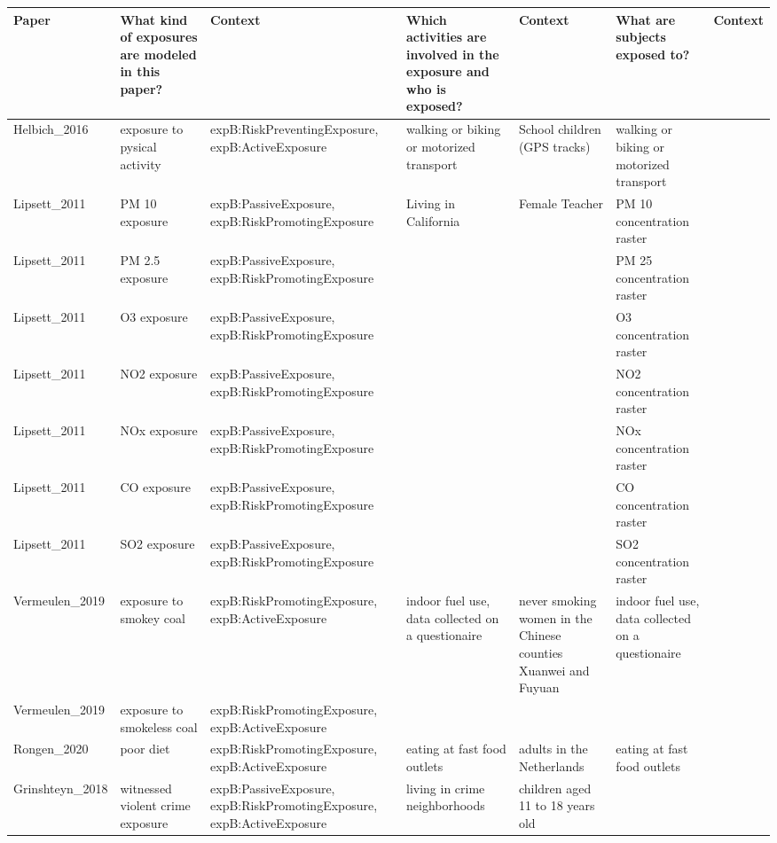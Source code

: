 \begin{tabular}{p{1cm}p{1cm}p{1cm}p{1cm}p{1cm}p{1cm}p{1cm}}
\toprule
          Paper & What kind of exposures are modeled in this paper? &                                                               Context & Which activities are involved in the exposure and who is exposed? &                                                        Context &                     What are subjects exposed to? & Context \\
\midrule
Helbich\_2016 & exposure to pysical activity & expB:RiskPreventingExposure, expB:ActiveExposure & walking or biking or motorized transport & School children (GPS tracks) & walking or biking or motorized transport &  \\
Lipsett\_2011 & PM 10 exposure & expB:PassiveExposure, expB:RiskPromotingExposure & Living in California & Female Teacher & PM 10 concentration raster &  \\
Lipsett\_2011 & PM 2.5 exposure & expB:PassiveExposure, expB:RiskPromotingExposure &  &  & PM 25 concentration raster &  \\
Lipsett\_2011 & O3 exposure & expB:PassiveExposure, expB:RiskPromotingExposure &  &  & O3 concentration raster &  \\
Lipsett\_2011 & NO2 exposure & expB:PassiveExposure, expB:RiskPromotingExposure &  &  & NO2 concentration raster &  \\
Lipsett\_2011 & NOx exposure & expB:PassiveExposure, expB:RiskPromotingExposure &  &  & NOx concentration raster &  \\
Lipsett\_2011 & CO exposure & expB:PassiveExposure, expB:RiskPromotingExposure &  &  & CO concentration raster &  \\
Lipsett\_2011 & SO2 exposure & expB:PassiveExposure, expB:RiskPromotingExposure &  &  & SO2 concentration raster &  \\
Vermeulen\_2019 & exposure to smokey coal & expB:RiskPromotingExposure, expB:ActiveExposure & indoor fuel use, data collected on a questionaire & never smoking women in the Chinese counties Xuanwei and Fuyuan & indoor fuel use, data collected on a questionaire &  \\
Vermeulen\_2019 & exposure to smokeless coal & expB:RiskPromotingExposure, expB:ActiveExposure &  &  &  &  \\
Rongen\_2020 & poor diet & expB:RiskPromotingExposure, expB:ActiveExposure & eating at fast food outlets & adults in the Netherlands & eating at fast food outlets &  \\
Grinshteyn\_2018 & witnessed violent crime exposure & expB:PassiveExposure, expB:RiskPromotingExposure, expB:ActiveExposure & living in crime neighborhoods & children aged 11 to 18 years old &  &  \\

\end{tabular}
